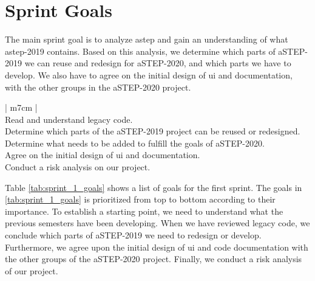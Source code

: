 \section{Sprint Goals}
The main sprint goal is to analyze \gls{astep} and gain an understanding of what \gls{astep}-2019 contains. Based on this analysis, we determine which parts of aSTEP-2019 we can reuse and redesign for aSTEP-2020, and which parts we have to develop. We also have to agree on the initial design of \gls{ui} and documentation, with the other groups in the aSTEP-2020 project.\newline 

\bgroup
\def\arraystretch{1.8}
\begin{table}[htbp]
    \centering
    \begin{tabular}{| m{7cm} |}
        \hline
         \\
        \hline
        Read and understand legacy code. \\
        \hline
        Determine which parts of the aSTEP-2019 project can be reused or redesigned. \\
        \hline
        Determine what needs to be added to fulfill the goals of aSTEP-2020. \\
        \hline
        Agree on the initial design of \gls{ui} and documentation. \\
        \hline
        Conduct a risk analysis on our project. \\
        \hline
    \end{tabular}
    \caption{The first sprint goals.}
    \label{tab:sprint_1_goals}
\end{table}
\egroup

\noindent
Table \ref{tab:sprint_1_goals} shows a list of goals for the first sprint. The goals in \ref{tab:sprint_1_goals} is prioritized from top to bottom according to their importance. To establish a starting point, we need to understand what the previous semesters have been developing. When we have reviewed legacy code, we conclude which parts of aSTEP-2019 we need to redesign or develop. Furthermore, we agree upon the initial design of \gls{ui} and code documentation with the other groups of the aSTEP-2020 project. Finally, we conduct a risk analysis of our project.
